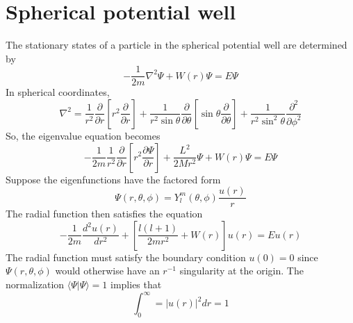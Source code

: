 \section{Spherical potential well}
The stationary states of a particle in the spherical potential well are determined by
\[-\frac{1}{2m}\nabla^2 \Psi  + W(r) \Psi = E\Psi \]
In spherical coordinates, 
\[\nabla^2 = \frac{1}{r^2} \frac{\partial}{\partial r} \left [ r^2\frac{\partial}{\partial r} \right ] + \frac{1}{r^2\sin\theta} \frac{\partial}{\partial \theta} \left [\sin\theta \frac{\partial}{\partial \theta} \right ] + \frac{1}{r^2\sin^2\theta} \frac{\partial^2}{\partial\phi^2}\]
So, the eigenvalue equation becomes
\[-\frac{1}{2m} \frac{1}{r^2} \frac{\partial}{\partial r} \left [ r^2\frac{\partial \Psi}{\partial r}\right ]  + \frac{L^2}{2Mr^2} \Psi + W(r)\Psi = E\Psi\]
Suppose the eigenfunctions have the factored form
\[\Psi(r,\theta,\phi) = Y_l^m(\theta,\phi) \frac{u(r)}{r}\]
The radial function then satisfies the equation
\[-\frac{1}{2m} \frac{d^2 u(r)}{dr^2} + \left[ \frac{l(l+1)}{2mr^2} + W(r)\right]u(r) = Eu(r)\]
The radial function must satisfy the boundary condition $u(0) = 0$ since $\Psi(r,\theta,\phi)$ would otherwise have an $r^{-1}$ singularity at the origin. The normalization $\langle \Psi | \Psi \rangle = 1$ implies that
\[\int_0^{\infty} = |u(r)|^2 dr = 1\]

